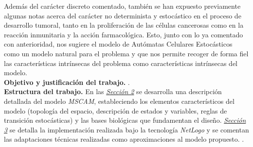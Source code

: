 Además del carácter discreto comentado, también se han expuesto previamente algunas notas acerca del carácter no determinista y estocástico en el proceso de desarrollo tumoral, tanto en la proliferación de las células cancerosas como en la reacción inmunitaria y la acción farmacológica. Esto, junto con lo ya comentado con anterioridad, nos sugiere el modelo de Autómatas Celulares Estocásticos \cite{Dobrushin1978} como un modelo natural para el problema y que nos permite recoger de forma fiel las características intrínsecas del problema como características intrínsecas del modelo.\\

\textbf{Objetivo y justificación del trabajo.} .\\

\textbf{Estructura del trabajo.} En las \hyperref[sec:model]{\textit{Sección 2}} se desarrolla una descripción detallada del modelo \textit{MSCAM}, estableciendo los elementos característicos del modelo (topología del espacio, descripción de estados y variables, reglas de transición estocásticas) y las bases biológicas que fundamentan el diseño. \hyperref[sec:impl]{\textit{Sección 3}} se detalla la implementación realizada bajo la tecnología \textit{NetLogo} y se comentan las adaptaciones técnicas realizadas como aproximaciones al modelo propuesto. .


